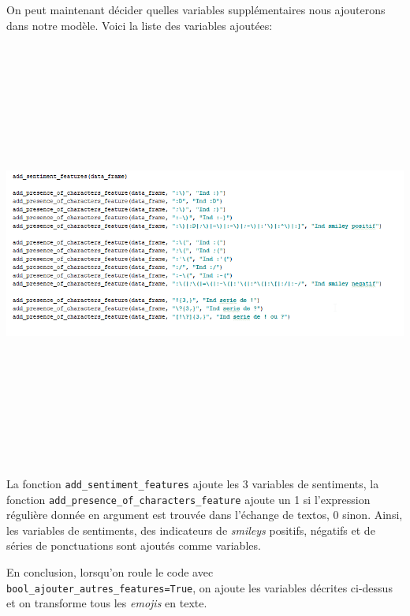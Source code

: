 On peut maintenant décider quelles variables supplémentaires nous ajouterons dans notre modèle. Voici la liste des variables ajoutées:

\includegraphics[width=\linewidth,height=14cm]{images/variables_autres}

La fonction \verb|add_sentiment_features| ajoute les 3 variables de sentiments, la fonction \verb|add_presence_of_characters_feature| ajoute un 1 si l'expression régulière donnée en argument est trouvée dans l'échange de textos, 0 sinon. Ainsi, les variables de sentiments, des indicateurs de \emph{smileys} positifs, négatifs et de séries de ponctuations sont ajoutés comme variables.

En conclusion, lorsqu'on roule le code avec \verb|bool_ajouter_autres_features=True|, on ajoute les variables décrites ci-dessus et on transforme tous les \emph{emojis} en texte.